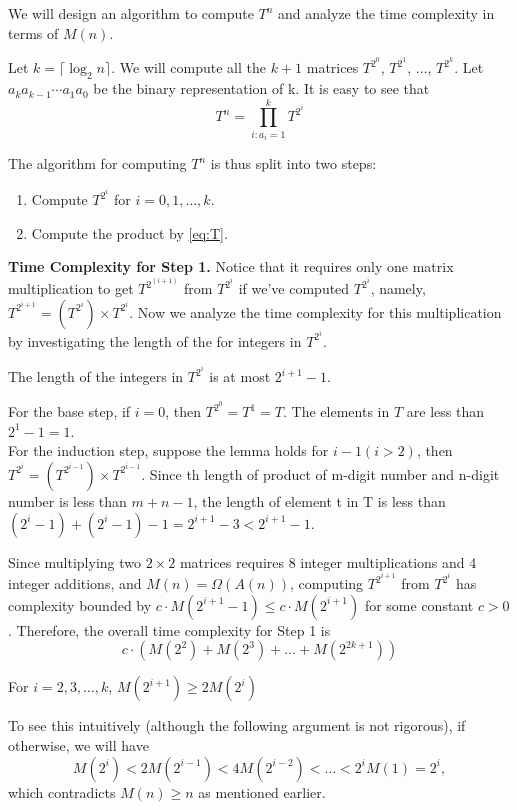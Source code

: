 We will design an algorithm to compute $T^{n}$ and analyze the time complexity in terms of $M(n)$.

Let $k=\lceil \log_2 n \rceil $. We will compute all the $k+1$ matrices $T^{2^0}$, $T^{2^1}$, $\ldots$, $T^{2^k}$. Let $a_k a_{k-1} \cdots a_1a_0$ be the binary representation of k. It is easy to see that
\begin{equation}
    T^n=\prod_{i:a_i=1}^{k} T^{2^i} 
    \label{eq:T}
\end{equation}

The algorithm for computing $T^{n}$ is thus split into two steps:
\begin{enumerate}
    \item Compute $T^{2^i}$ for $i=0,1,\ldots,k$.
    \item Compute the product by \eqref{eq:T}.
\end{enumerate}

\textbf{Time Complexity for Step 1.} Notice that it requires only one matrix multiplication to get $T^{2^(i+1)}$ from $T^{2^{i}}$ if we've computed $T^{2^i}$, namely, $T^{2^{i+1}}=(T^{2^i})\times T^{2^i}$.
Now we analyze the time complexity for this multiplication by investigating the length of the for integers in $T^{2^i}$.
\begin{lemma}
    The length of the integers in $T^{2^i}$ is at most $2^{i+1}-1$.
\end{lemma}
\begin{prf}
    For the base step, if $i=0$, then $T^{2^0}=T^{1}=T$. The elements in $T$ are less than $2^{1}-1=1$.\\
    For the induction step, suppose the lemma holds for $i-1(i>2)$, then $T^{2^i}=(T^{2^{i-1}})\times T^{2^{i-1}}$. 
    Since th length of product of m-digit number and n-digit number is less than $m+n-1$,
    the length of element t in T is less than $(2^i-1) + (2^i-1)-1 = 2^{i+1}-3 < 2^{i+1}-1$.
\end{prf}

Since multiplying two $2 \times 2$ matrices requires 8 integer multiplications and 4 integer additions, 
and $M(n) = \Omega(A(n))$, computing $T^{2^{i+1}}$ from $T^{2^i}$ has complexity bounded by $c \cdot M(2^{i+1} -1) \leq c \cdot M(2^{i+1})$ for some constant $c > 0$. Therefore, the overall time complexity for Step 1 is
\begin{equation}
    \label{eq:step1}
    c \cdot (M(2^2) + M(2^3) + \ldots + M(2^{2k+1}))
\end{equation}

\begin{lemma}
    For $i=2,3,\ldots,k$, $M(2^{i+1}) \geq 2M(2^i)$
\end{lemma}
\begin{prf}
To see this intuitively (although the following argument is not rigorous), if otherwise, we will have
\[M(2^i) < 2M(2^{i-1}) < 4M(2^{i-2}) < \ldots < 2^iM(1) = 2^i,\]
which contradicts $M(n) \geq n$ as mentioned earlier.
\end{prf}

